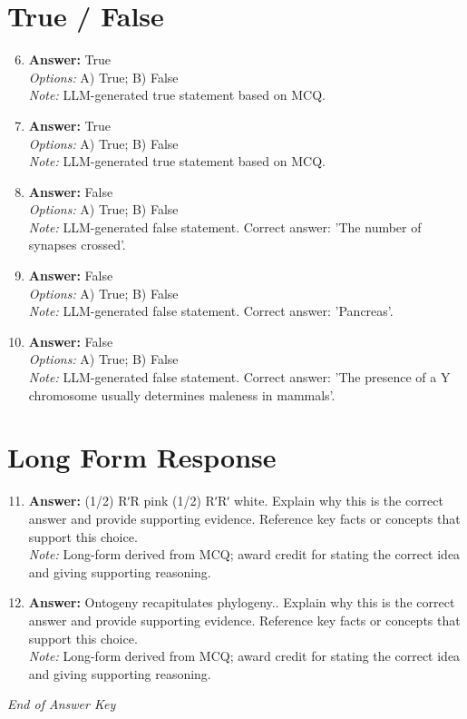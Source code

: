 \documentclass[12pt]{article}
\begin{document}
\section*{True / False}
\begin{enumerate}[label=\arabic*.]
\setcounter{enumi}{5}
\item \textbf{Answer:} True
\\ \textit{Options:} A) True; B) False
\\ \textit{Note:} LLM-generated true statement based on MCQ.
\item \textbf{Answer:} True
\\ \textit{Options:} A) True; B) False
\\ \textit{Note:} LLM-generated true statement based on MCQ.
\item \textbf{Answer:} False
\\ \textit{Options:} A) True; B) False
\\ \textit{Note:} LLM-generated false statement. Correct answer: 'The number of synapses crossed'.
\item \textbf{Answer:} False
\\ \textit{Options:} A) True; B) False
\\ \textit{Note:} LLM-generated false statement. Correct answer: 'Pancreas'.
\item \textbf{Answer:} False
\\ \textit{Options:} A) True; B) False
\\ \textit{Note:} LLM-generated false statement. Correct answer: 'The presence of a Y chromosome usually determines maleness in mammals'.
\end{enumerate}

\section*{Long Form Response}
\begin{enumerate}[label=\arabic*.]
\setcounter{enumi}{10}
\item \textbf{Answer:} (1/2) RʹR pink (1/2) RʹRʹ white. Explain why this is the correct answer and provide
supporting evidence. Reference key facts or concepts that support this choice.
\\ \textit{Note:} Long-form derived from MCQ; award credit for stating the correct idea and giving supporting reasoning.
\item \textbf{Answer:} Ontogeny recapitulates phylogeny.. Explain why this is the correct answer and provide
supporting evidence. Reference key facts or concepts that support this choice.
\\ \textit{Note:} Long-form derived from MCQ; award credit for stating the correct idea and giving supporting reasoning.
\end{enumerate}

\vfill
\noindent\textit{End of Answer Key}
\end{document}
